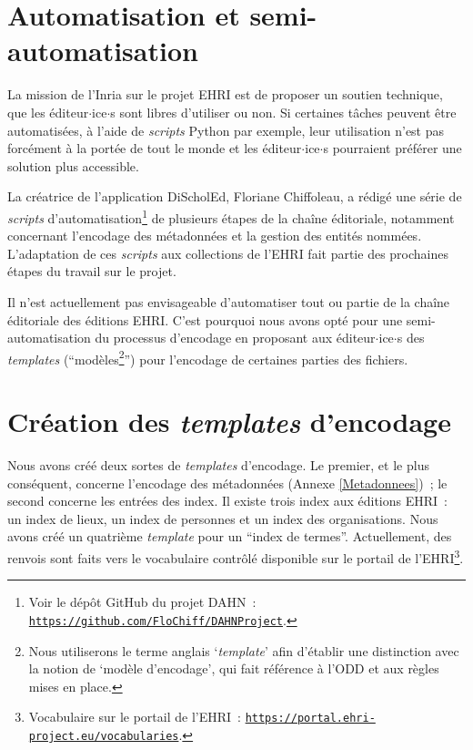 
\section{Automatisation et semi-automatisation}
La mission de l'Inria sur le projet EHRI est de proposer un soutien technique, que les éditeur$\cdot$ice$\cdot$s sont libres d'utiliser ou non. Si certaines tâches peuvent être automatisées, à l'aide de \textit{scripts} Python par exemple, leur utilisation n'est pas forcément à la portée de tout le monde et les éditeur$\cdot$ice$\cdot$s pourraient préférer une solution plus accessible.  

La créatrice de l'application DiScholEd, Floriane Chiffoleau, a rédigé une série de \textit{scripts} d'automatisation\footnote{Voir le dépôt GitHub du projet DAHN~: \texttt{\href{https://github.com/FloChiff/DAHNProject}{https://github.com/FloChiff/DAHNProject}}.} de plusieurs étapes de la chaîne éditoriale, notamment concernant l'encodage des métadonnées et la gestion des entités nommées. L'adaptation de ces \textit{scripts} aux collections de l'EHRI fait partie des prochaines étapes du travail sur le projet.  

Il n'est actuellement pas envisageable d'automatiser tout ou partie de la chaîne éditoriale des éditions EHRI. C'est pourquoi nous avons opté pour une semi-automatisation du processus d'encodage en proposant aux éditeur$\cdot$ice$\cdot$s des \textit{templates} (\enquote{modèles\footnote{Nous utiliserons le terme anglais \enquote{\textit{template}} afin d'établir une distinction avec la notion de \enquote{modèle d'encodage}, qui fait référence à l'ODD et aux règles mises en place.}}) pour l'encodage de certaines parties des fichiers.



\section{Création des \textit{templates} d'encodage}
Nous avons créé deux sortes de \textit{templates} d'encodage. Le premier, et le plus conséquent, concerne l'encodage des métadonnées (Annexe \ref{Metadonnees})~; le second concerne les entrées des index. Il existe trois index aux éditions EHRI~: un index de lieux, un index de personnes et un index des organisations. Nous avons créé un quatrième \textit{template} pour un \enquote{index de termes}. Actuellement, des renvois sont faits vers le vocabulaire contrôlé disponible sur le portail de l'EHRI\footnote{Vocabulaire sur le portail de l'EHRI~: \texttt{\href{https://portal.ehri-project.eu/vocabularies}{https://portal.ehri-project.eu/vocabularies}}.}.  

